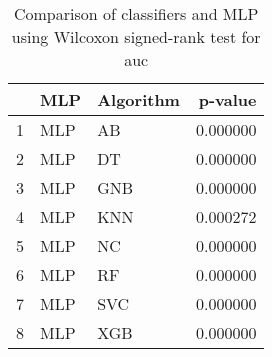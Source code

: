 \begin{table}
\footnotesize
\caption{Comparison of classifiers and MLP using Wilcoxon signed-rank test for auc}
\label{tab:MLP wilcoxon AUC comparison}
\begin{tabular}{lllr}
\hline
 & MLP & Algorithm & p-value \\
\hline
1 & MLP & AB & 0.000000 \\
2 & MLP & DT & 0.000000 \\
3 & MLP & GNB & 0.000000 \\
4 & MLP & KNN & 0.000272 \\
5 & MLP & NC & 0.000000 \\
6 & MLP & RF & 0.000000 \\
7 & MLP & SVC & 0.000000 \\
8 & MLP & XGB & 0.000000 \\
\hline
\end{tabular}
\end{table}
